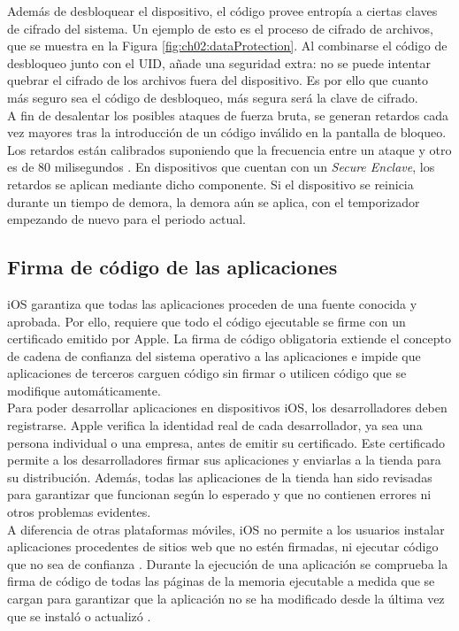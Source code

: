 Además de desbloquear el dispositivo, el código provee entropía a ciertas claves de cifrado del sistema. Un ejemplo de esto es el proceso de cifrado de archivos, que se muestra en la Figura \ref{fig:ch02:dataProtection}. Al combinarse el código de desbloqueo junto con el UID, añade una seguridad extra: no se puede intentar quebrar el cifrado de los archivos fuera del dispositivo. Es por ello que cuanto más seguro sea el código de desbloqueo, más segura será la clave de cifrado.\\

A fin de desalentar los posibles ataques de fuerza bruta, se generan retardos cada vez mayores tras la introducción de un código inválido en la pantalla de bloqueo. Los retardos están calibrados suponiendo que la frecuencia entre un ataque y otro es de 80 milisegundos \cite{asg}. En dispositivos que cuentan con un \textit{Secure Enclave}, los retardos se aplican mediante dicho componente. Si el dispositivo se reinicia durante un tiempo de demora, la demora aún se aplica, con el temporizador empezando de nuevo para el periodo actual.
\subsection{Firma de código de las aplicaciones}
iOS garantiza que todas las aplicaciones proceden de una fuente conocida y aprobada. Por ello, requiere que todo el código ejecutable se firme con un certificado emitido por Apple. La firma de código obligatoria extiende el concepto de cadena de confianza del sistema operativo a las aplicaciones e impide que aplicaciones de terceros carguen código sin firmar o utilicen código que se modifique automáticamente.\\

Para poder desarrollar aplicaciones en dispositivos iOS, los desarrolladores deben registrarse. Apple verifica la identidad real de cada desarrollador, ya sea una persona individual o una empresa, antes de emitir su certificado. Este certificado permite a los desarrolladores firmar sus aplicaciones y enviarlas a la tienda para su distribución. Además, todas las aplicaciones de la tienda han sido revisadas para garantizar que funcionan según lo esperado y que no contienen errores ni otros problemas evidentes.\\

A diferencia de otras plataformas móviles, iOS no permite a los usuarios instalar aplicaciones procedentes de sitios web que no estén firmadas, ni ejecutar código que no sea de confianza \cite{asg}. Durante la ejecución de una aplicación se comprueba la firma de código de todas las páginas de la memoria ejecutable a medida que se cargan para garantizar que la aplicación no se ha modificado desde la última vez que se instaló o actualizó \cite{asg}.
